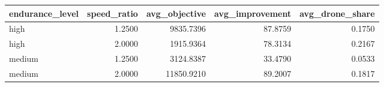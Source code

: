 \begin{tabular}{lrrrr}
\toprule
endurance_level & speed_ratio & avg_objective & avg_improvement & avg_drone_share \\
\midrule
high & 1.2500 & 9835.7396 & 87.8759 & 0.1750 \\
high & 2.0000 & 1915.9364 & 78.3134 & 0.2167 \\
medium & 1.2500 & 3124.8387 & 33.4790 & 0.0533 \\
medium & 2.0000 & 11850.9210 & 89.2007 & 0.1817 \\
\bottomrule
\end{tabular}
